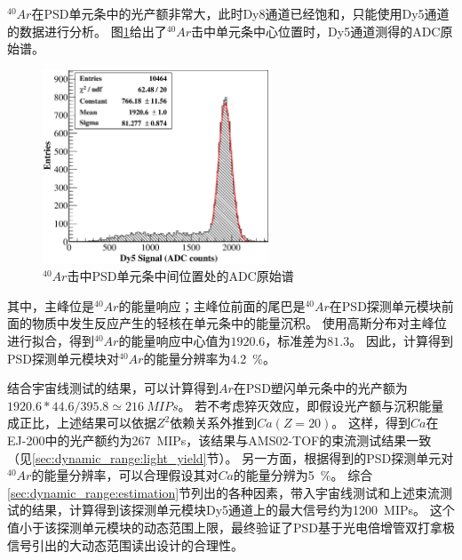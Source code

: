 $^{40}Ar$在PSD单元条中的光产额非常大，此时Dy8通道已经饱和，只能使用Dy5通道的数据进行分析。
图\ref{fig:dynamic_range:Ar}给出了$^{40}Ar$击中单元条中心位置时，Dy5通道测得的ADC原始谱。
\begin{figure}[htbp]
	\centering
	\includegraphics[width=0.6\textwidth]{chap/dynamic_range/fig/Ar.eps}
	\caption{$^{40}Ar$击中PSD单元条中间位置处的ADC原始谱}
	\label{fig:dynamic_range:Ar}
\end{figure}
其中，主峰位是$^{40}Ar$的能量响应；主峰位前面的尾巴是$^{40}Ar$在PSD探测单元模块前面的物质中发生反应产生的轻核在单元条中的能量沉积。
使用高斯分布对主峰位进行拟合，得到$^{40}Ar$的能量响应中心值为$1920.6$，标准差为$81.3$。
因此，计算得到PSD探测单元模块对$^{40}Ar$的能量分辨率为\SI{4.2}{\percent}。

结合宇宙线测试的结果，可以计算得到$Ar$在PSD塑闪单元条中的光产额为$1920.6*44.6/395.8 \simeq \SI{216}{MIPs}$。
若不考虑猝灭效应，即假设光产额与沉积能量成正比，上述结果可以依据$Z^2$依赖关系外推到$Ca(Z=20)$。
这样，得到$Ca$在EJ-200中的光产额约为\SI{267}{MIPs}，该结果与AMS02-TOF的束流测试结果一致（见\ref{sec:dynamic_range:light_yield}节）。
另一方面，根据得到的PSD探测单元对$^{40}Ar$的能量分辨率，可以合理假设其对$Ca$的能量分辨为\SI{5}{\percent}。
综合\ref{sec:dynamic_range:estimation}节列出的各种因素，带入宇宙线测试和上述束流测试的结果，计算得到该探测单元模块Dy5通道上的最大信号约为\SI{1200}{MIPs}。
这个值小于该探测单元模块的动态范围上限，最终验证了PSD基于光电倍增管双打拿极信号引出的大动态范围读出设计的合理性。
